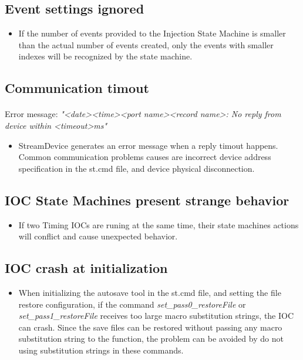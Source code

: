 \documentclass[openany]{article}
\begin{document}
	\subsection{Event settings ignored}
		\begin{itemize}
		\item If the number of events provided to the Injection State Machine is smaller than the actual number of events created, only the events with smaller indexes will be recognized by the state machine.
		\end{itemize}

	\subsection{Communication timout}

		\paragraph{} Error message: \emph{"\textless date\textgreater \textless time\textgreater \textless port name\textgreater \textless record name\textgreater: No reply from device within \textless timeout\textgreater ms"}

		\begin{itemize}
		\item StreamDevice generates an error message when a reply timout happens. Common communication problems causes are incorrect device address specification in the st.cmd file, and device physical disconnection.
		\end{itemize}

	\subsection{IOC State Machines present strange behavior}

		\begin{itemize}
		\item If two Timing IOCs are runing at the same time, their state machines actions will conflict and cause unexpected behavior.
		\end{itemize}

	\subsection{IOC crash at initialization}

		\begin{itemize}
		\item When initializing the autosave tool in the st.cmd file, and setting the file restore configuration, if the command \emph{set\_pass0\_restoreFile} or \emph{set\_pass1\_restoreFile} receives too large macro substitution strings, the IOC can crash. Since the save files can be restored without passing any macro substitution string to the function, the problem can be avoided by do not using substitution strings in these commands. 
		\end{itemize}
\end{document}
